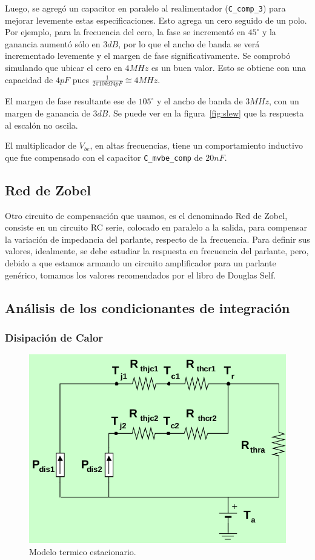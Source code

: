 \documentclass[a4paper,12pt,twoside]{article}
\begin{document}
Luego, se agregó un capacitor en paralelo al realimentador (\texttt{C\_comp\_3}) para mejorar levemente estas especificaciones. Esto agrega un cero seguido de un polo. Por ejemplo, para la frecuencia del cero, la fase se incrementó en $45^{\circ}$ y la ganancia aumentó sólo en $3dB$, por lo que el ancho de banda se verá incrementado levemente y el margen de fase significativamente. Se comprobó simulando que ubicar el cero en $4MHz$ es un buen valor. Esto se obtiene con una capacidad de $4pF$ pues $\frac{1}{2 \pi 10k\Omega 4pF}\cong 4MHz$.

El margen de fase resultante ese de $105^{\circ}$ y el ancho de banda de $3MHz$, con un margen de ganancia de $3dB$. Se puede ver en la figura~\ref{fig:slew} que la respuesta al escalón no oscila.

El multiplicador de $V_{be}$, en altas frecuencias, tiene un comportamiento inductivo que fue compensado con el capacitor \texttt{C\_mvbe\_comp} de $20nF$.

\subsection{Red de Zobel}

Otro circuito de compensación que usamos, es el denominado Red de Zobel, consiste en un circuito RC serie, colocado en paralelo a la salida, para compensar la variación de impedancia del parlante, respecto de la frecuencia. Para definir sus valores, idealmente, se debe estudiar la respuesta en frecuencia del parlante, pero, debido a que estamos armando un circuito amplificador para un parlante genérico, tomamos los valores recomendados por el libro de Douglas Self. 

\subsection{Análisis de los condicionantes de integración}

\subsubsection{Disipación de Calor}
\begin{figure}[H]
    \centering
    \includegraphics[height=0.4\textwidth]{img/calculo_disipador}
    \caption{Modelo termico estacionario.}
    \label{fig:disipadores}
\end{figure}
\end{document}
